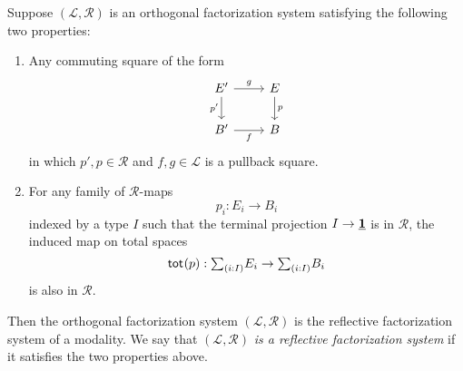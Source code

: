 \documentclass[9pt,twosided]{amsart}
\begin{document}
\begin{thm}\label{thm:rfs}
  Suppose $(\mathcal{L},\mathcal{R})$ is an orthogonal factorization system satisfying the following two properties:
  \begin{enumerate}
  \item Any commuting square of the form
    \begin{equation*}
      \begin{tikzcd}
        E' \arrow[d,swap,"{p'}"] \arrow[r,"g"] & E \arrow[d,"p"] \\
        B' \arrow[r,swap,"f"] & B
      \end{tikzcd}
    \end{equation*}
    in which $p',p\in\mathcal{R}$ and $f,g\in\mathcal{L}$ is a pullback square.
  \item For any family of $\mathcal{R}$-maps
    \begin{equation*}
      p_i:E_i\to B_i
    \end{equation*}
    indexed by a type $I$ such that the terminal projection $I\to\underline{\mathbf{1}}$ is in $\mathcal{R}$, the induced map on total spaces
    \begin{equation*}
      \total{p}:\sm{i:I}E_i\to\sm{i:I}B_i
    \end{equation*}
    is also in $\mathcal{R}$. 
  \end{enumerate}
  Then the orthogonal factorization system $(\mathcal{L},\mathcal{R})$ is the reflective factorization system of a modality. We say that $(\mathcal{L},\mathcal{R})$ \emph{is a reflective factorization system} if it satisfies the two properties above.
\end{thm}
\end{document}
